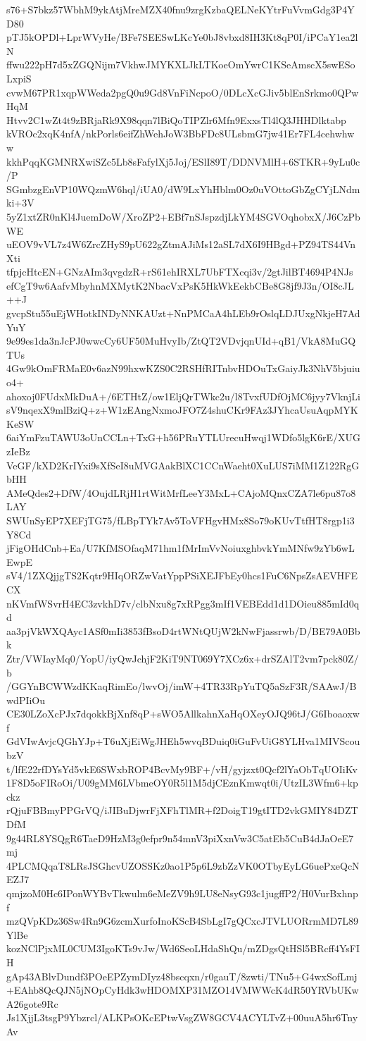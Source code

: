 s76+S7bkz57WbhM9ykAtjMreMZX40fnu9zrgKzbaQELNeKYtrFuVvmGdg3P4YD80
pTJ5kOPDl+LprWVyHe/BFe7SEESwLKcYe0bJ8vbxd8IH3Kt8qP0I/iPCaY1ea2lN
ffwu222pH7d5xZGQNijm7VkhwJMYKXLJkLTKoeOmYwrC1KSeAmscX5swESoLxpiS
cvwM67PR1xqpWWeda2pgQ0u9Gd8VnFiNcpoO/0DLcXcGJiv5blEnSrkmo0QPwHqM
Htvv2C1wZt4t9zBRjaRk9X98qqn7lBiQoTIPZlr6Mfn9ExxsTl4lQ3JHHDlktabp
kVROc2xqK4nfA/nkPorls6eifZhWehJoW3BbFDc8ULsbmG7jw41Er7FL4cehwhww
kkhPqqKGMNRXwiSZc5Lb8sFafylXj5Joj/ESlI89T/DDNVMlH+6STKR+9yLu0c/P
SGmbzgEnVP10WQzmW6hql/iUA0/dW9LxYhHblm0Oz0uVOttoGbZgCYjLNdmki+3V
5yZ1xtZR0nKl4JuemDoW/XroZP2+EBf7nSJspzdjLkYM4SGVOqhobxX/J6CzPbWE
uEOV9vVL7z4W6ZrcZHyS9pU622gZtmAJiMs12aSL7dX6I9HBgd+PZ94TS44VnXti
tfpjcHtcEN+GNzAIm3qvgdzR+rS61ehIRXL7UbFTXcqi3v/2gtJilBT4694P4NJs
efCgT9w6AafvMbyhnMXMytK2NbacVxPsK5HkWkEekbCBe8G8jf9J3n/OI8cJL++J
gvcpStu55uEjWHotkINDyNNKAUzt+NnPMCaA4hLEb9rOslqLDJUxgNkjeH7AdYuY
9e99es1da3nJcPJ0wwcCy6UF50MuHvyIb/ZtQT2VDvjqnUId+qB1/VkA8MuGQTUs
4Gw9kOmFRMaE0v6azN99hxwKZS0C2RSHfRITnbvHDOuTxGaiyJk3NhV5bjuiuo4+
ahoxoj0FUdxMkDuA+/6ETHtZ/ow1EljQrTWkc2u/l8TvxfUDfOjMC6jyy7VknjLi
sV9nqexX9mlBziQ+z+W1zEAngNxmoJFO7Z4shuCKr9FAz3JYhcaUsuAqpMYKKeSW
6aiYmFzuTAWU3oUnCCLn+TxG+h56PRuYTLUrecuHwqj1WDfo5lgK6rE/XUGzIeBz
VeGF/kXD2KrIYxi9sXfSeI8uMVGAakBlXC1CCnWaeht0XuLUS7iMM1Z122RgGbHH
AMeQdes2+DfW/4OujdLRjH1rtWitMrfLeeY3MxL+CAjoMQnxCZA7le6pu87o8LAY
SWUnSyEP7XEFjTG75/fLBpTYk7Av5ToVFHgvHMx8So79oKUvTtfHT8rgp1i3Y8Cd
jFigOHdCnb+Ea/U7KfMSOfaqM71hm1fMrImVvNoiuxghbvkYmMNfw9zYb6wLEwpE
sV4/1ZXQjjgTS2Kqtr9HIqORZwVatYppPSiXEJFbEy0hcs1FuC6NpsZsAEVHFECX
nKVmfWSvrH4EC3zvkhD7v/clbNxu8g7xRPgg3mIf1VEBEdd1d1DOieu885mId0qd
aa3pjVkWXQAyc1ASf0mIi3853fBsoD4rtWNtQUjW2kNwFjassrwb/D/BE79A0Bbk
Ztr/VWIayMq0/YopU/iyQwJchjF2KiT9NT069Y7XCz6x+drSZAlT2vm7pck80Z/b
/GGYnBCWWzdKKaqRimEo/lwvOj/imW+4TR33RpYuTQ5aSzF3R/SAAwJ/BwdPIiOu
CE30LZoXcPJx7dqokkBjXnf8qP+sWO5AllkahnXaHqOXeyOJQ96tJ/G6Iboaoxwf
GdVIwAvjcQGhYJp+T6uXjEiWgJHEh5wvqBDuiq0iGuFvUiG8YLHva1MIVScoubzV
t/lfE22rfDYsYd5vkE6SWxbROP4BcvMy9BF+/vH/gyjzxt0Qcf2lYaObTqUOIiKv
1F8D5oFIRoOi/U09gMM6LVbmeOY0R5l1M5djCEznKmwqt0i/UtzIL3Wfm6+kpckz
rQjuFBBmyPPGrVQ/iJIBuDjwrFjXFhTlMR+f2DoigT19gtITD2vkGMIY84DZTDfM
9g44RL8YSQgR6TaeD9HzM3g0efpr9n54mnV3piXxnVw3C5atEb5CuB4dJaOeE7mj
4PLCMQqaT8LRsJSGhcvUZOSSKz0ao1P5p6L9zbZzVK0OTbyEyLG6uePxeQcNEZJ7
qmjzoM0Hc6IPonWYBvTkwulm6eMeZV9h9LU8eNsyG93c1jugffP2/H0VurBxhnpf
mzQVpKDz36Sw4Rn9G6zcmXurfoInoKScB4SbLgI7gQCxcJTVLUORrmMD7L89YlBe
kozNClPjxML0CUM3IgoKTs9vJw/Wd6SeoLHdaShQu/mZDgsQtHSl5BRcff4YsFIH
gAp43ABlvDundf3POeEPZymDIyz48bscqxn/r0gauT/8zwti/TNu5+G4wxSofLmj
+EAhb8QcQJN5jNOpCyHdk3wHDOMXP31MZO14VMWWcK4dR50YRVbUKwA26gote9Rc
Js1XjjL3tsgP9Ybzrcl/ALKPsOKcEPtwVsgZW8GCV4ACYLTvZ+00uuA5hr6TnyAv
